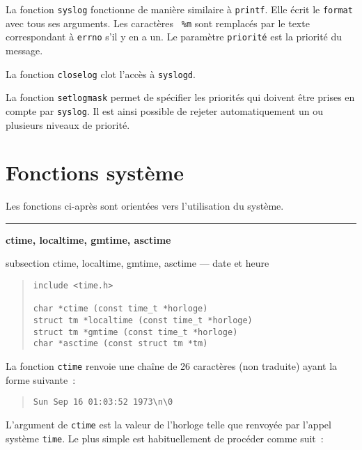 \documentclass [twoside] {report}
\newcommand {\primitive} [1]
    {
	{\large \bf #1}
	\addcontentsline {toc} {subsection} {#1}
    }
\newcommand {\separation}
    {
	\vspace {7mm}
	\nopagebreak
	\hrule
    }
\begin{document}
La fonction {\tt syslog} fonctionne de manière similaire à {\tt printf}.
Elle écrit le {\tt format} avec tous ses arguments. Les caractères {\tt
\%m} sont remplacés par le texte correspondant à {\tt errno} s'il y en a
un.  Le paramètre {\tt priorité} est la priorité du message.

La fonction {\tt closelog} clot l'accès à {\tt syslogd}.

La fonction {\tt setlogmask} permet de spécifier les priorités qui
doivent être prises en compte par {\tt syslog}. Il est ainsi possible de
rejeter automatiquement un ou plusieurs niveaux de priorité.




\section {Fonctions système}



Les fonctions ci-après sont orientées vers l'utilisation du
système.



\separation 
\primitive {ctime, localtime, gmtime, asctime} --- date et heure

\begin {quote}
\begin {verbatim}
include <time.h>

char *ctime (const time_t *horloge)
struct tm *localtime (const time_t *horloge)
struct tm *gmtime (const time_t *horloge)
char *asctime (const struct tm *tm)
\end{verbatim}
\end {quote}

La fonction {\tt ctime} renvoie une chaîne de 26 caractères
(non traduite) ayant la forme suivante~:
\begin {quote}
\begin {verbatim}
Sun Sep 16 01:03:52 1973\n\0
\end{verbatim}
\end {quote}
L'argument de {\tt ctime} est la valeur de l'horloge telle
que renvoyée par l'appel système {\tt time}. Le plus simple est
habituellement de procéder comme suit~:
\end{document}
